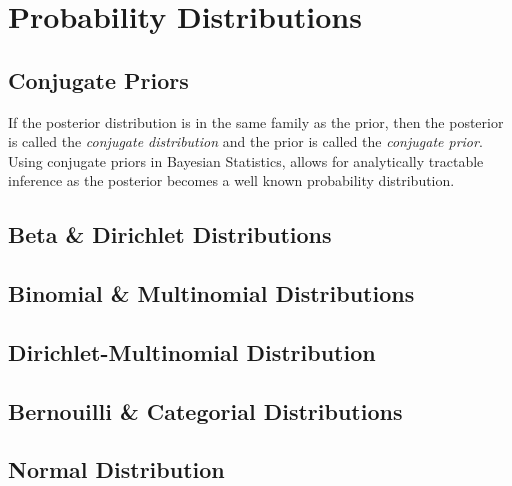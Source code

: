 \section{Probability Distributions}
\subsection{Conjugate Priors}\label{sec:theory_conjugate_priors}
If the posterior distribution is in the same family as the prior, then the posterior is called the \textit{conjugate distribution} and the prior is called the \textit{conjugate prior}. Using conjugate priors in Bayesian Statistics, allows for analytically tractable inference as the posterior becomes a well known probability distribution.

\subsection{Beta \& Dirichlet Distributions}
\subsection{Binomial \& Multinomial Distributions}
\subsection{Dirichlet-Multinomial Distribution}
\subsection{Bernouilli \& Categorial Distributions}
\subsection{Normal Distribution}
